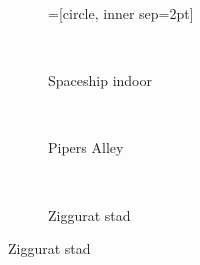 \begin{figure}[t]
  \hspace{0.05\textwidth}%
  \begin{subfigure}[b]{\textwidth}
  =[circle, inner sep=2pt]
    
  \end{subfigure}\hfill\\
  \begin{minipage}[t]{0.5\textwidth}
  \begin{adjustbox}{minipage=\textwidth, scale=0.55}
    \begin{subfigure}[b]{1.6\textwidth}
      \centering
      \def\svgwidth{\textwidth}
      
      \caption{Spaceship indoor}
      \vspace{4pt}
      \label{fig:fds-test-lights:indoor}
    \end{subfigure}
  \end{adjustbox} \\
  \begin{adjustbox}{minipage=\textwidth, scale=0.55}
    \begin{subfigure}[b]{1.6\textwidth}
      \centering
      \def\svgwidth{\textwidth}
      
      \caption{Pipers Alley}
      \vspace{4pt}
      \label{fig:fds-test-lights:alley}
    \end{subfigure}
  \end{adjustbox} \\
  \begin{adjustbox}{minipage=\textwidth, scale=0.55}
    \begin{subfigure}[b]{1.6\textwidth}
      \centering
      \def\svgwidth{\textwidth}
      
      \caption{Ziggurat stad}
      \label{fig:fds-test-lights:city}
    \end{subfigure}
  \end{adjustbox}

\end{minipage}
\end{figure}
